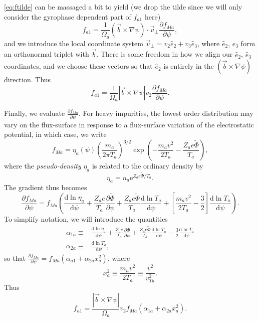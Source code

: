 \documentclass[12pt, a4paper]{article}
\newcommand{\e}{\ensuremath{\mathrm{e}}}
\newcommand{\p}{\ensuremath{\partial}}
\renewcommand{\d}{\ensuremath{\mathrm{d}}}
\begin{document}
\autoref{eq:ftilde} can be massaged a bit to yield (we drop the tilde since we will only consider the gyrophase dependent part of $f_{a1}$ here)
\begin{equation}
f_{a1} = \frac{1}{\Omega_a}(\vec{b}\times \nabla \psi) \cdot  \vec{v}_\perp\frac{\p f_{Ma}}{\p \psi},
\end{equation}
and we introduce the local coordinate system $\vec{v}_\perp = v_2 \hat{e}_2 + v_3 \hat{e}_3$, where $\hat{e}_2$, $\hat{e}_3$ form an orthonormal triplet with $\vec{b}$. There is some freedom in how we align our $\hat{e}_2$, $\hat{e}_3$ coordinates, and we choose these vectors so that $\hat{e}_2$ is entirely in the $(\vec{b}\times \nabla \psi)$ direction. Thus
\begin{equation}
f_{a1} = \frac{1}{\Omega_a}|\vec{b}\times \nabla \psi| v_2 \frac{\p f_{Ma}}{\p \psi}.
\end{equation}

Finally, we evaluate $\frac{\p f_{Ma}}{\p \psi}$. For heavy impurities, the lowest order distribution may vary on the flux-surface in response to a flux-surface variation of the electrostatic potential, in which case, we write
\begin{equation}
f_{Ma} = \eta_a(\psi) \left(\frac{m_a}{2\pi T_a}\right)^{3/2} \exp{\left(-\frac{m_av^2}{2T_a} - \frac{Z_a e \tilde{\Phi}}{T_a}\right)},
\end{equation}
where the \emph{pseudo-density} $\eta_a$ is related to the ordinary density by
\begin{equation}
\eta_a = n_a \e^{Z_a e \tilde{\Phi}/T_a}.
\end{equation}
The gradient thus becomes
\begin{equation}
\frac{\p f_{Ma}}{\p \psi} = f_{Ma}\left(\frac{\d \ln\eta_a}{\d \psi} + \frac{Z_a e}{T_a} \frac{\p \tilde{\Phi}}{\p \psi}  + \frac{Z_a e \tilde{\Phi}}{T_a} \frac{\d \ln T_a}{\d \psi}
 + \left[\frac{m_a v^2}{2T_a} - \frac{3}{2}\right]  \frac{\d \ln T_a}{\d \psi}\right). \label{eq:dpsif0}
\end{equation}
To simplify notation, we will introduce the quantities
\begin{align}
\alpha_{1a} \equiv & \frac{\d \ln\eta_a}{\d \psi} + \frac{Z_a e}{T_a} \frac{\p \tilde{\Phi}}{\p \psi}  + \frac{Z_a e \tilde{\Phi}}{T_a} \frac{\d \ln T_a}{\d \psi}
  - \frac{3}{2}  \frac{\d \ln T_a}{\d \psi} \\
  \alpha_{2a} \equiv & \frac{\d \ln T_a}{\d \psi},
\end{align}
so that $\frac{\p f_{Ma}}{\p \psi} = f_{Ma}(\alpha_{a1} + \alpha_{2a} x_a^2)$,
where
\begin{equation}
x_a^2 \equiv \frac{m_a v^2}{2T_a} \equiv \frac{v^2}{v_{Ta}^2}.
\end{equation}
Thus
\begin{equation}
f_{a1} = \frac{|\vec{b}\times \nabla \psi| }{\Omega_a}v_2 f_{Ma}(\alpha_{1a} + \alpha_{2a} x_a^2).
\end{equation}
\end{document}
